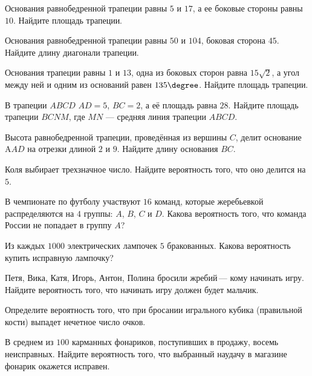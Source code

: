 \begin{class}[number=4]
\begin{listofex}
		\item Основания равнобедренной трапеции равны \( 5 \) и \( 17 \), а ее боковые стороны равны \( 10 \). Найдите площадь трапеции.
		\item Основания равнобедренной трапеции равны \( 50 \) и \( 104 \), боковая сторона \( 45 \). Найдите длину диагонали трапеции.
		\item Основания трапеции равны \( 1 \) и \( 13 \), одна из боковых сторон равна \( 15\sqrt{2} \), а угол между ней и одним из оснований равен \( 135\degree \). Найдите площадь трапеции.
		\item В трапеции \( ABCD \) \( AD=5 \), \( BC=2 \), а её площадь равна \( 28 \). Найдите площадь трапеции \( BCNM \), где \( MN \) --- средняя линия трапеции \( ABCD \).
		\item Высота равнобедренной трапеции, проведённая из вершины \( C \), делит основание A\( AD \) на отрезки длиной \( 2 \) и \( 9 \). Найдите длину основания \( BC \).
		\item Коля выбирает трехзначное число. Найдите вероятность того, что оно делится на \( 5 \).
		\item В чемпионате по футболу участвуют \( 16 \) команд, которые жеребьевкой распределяются на \( 4 \) группы: \( A \), \( B \), \( C \) и \( D \). Какова вероятность того, что команда России не попадает в группу \( A \)?
		\item Из каждых \( 1000 \) электрических лампочек \( 5 \) бракованных. Какова вероятность купить исправную лампочку?
		\item Петя, Вика, Катя, Игорь, Антон, Полина бросили жребий --- кому начинать игру. Найдите вероятность того, что начинать игру должен будет мальчик.
		\item Определите вероятность того, что при бросании игрального кубика (правильной кости) выпадет нечетное число очков.
		\item В среднем из \( 100 \) карманных фонариков, поступивших в продажу, восемь неисправных. Найдите вероятность того, что выбранный наудачу в магазине фонарик окажется исправен.
	\end{listofex}
\end{class}

